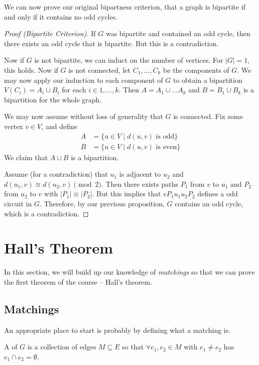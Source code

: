 We can now prove our original bipartness criterion, that a graph is bipartite if and only if it contains no odd cycles.

\begin{proof}[Proof (Bipartite Criterion)]
	If $G$ was bipartite and contained an odd cycle, then there exists an odd cycle that is bipartite. But this is a contradiction.

	Now if $G$ is not bipartite, we can induct on the number of vertices. For $|G| = 1$, this holds. Now if $G$ is not connected, let $C_1, \dots, C_k$ be the components of $G$. We may now apply our induction to each component of $G$ to obtain a bipartition $V(C_i) = A_i \cup B_i$ for each $i \in 1, \dots, k$. Then $A = A_1 \cup \dots A_k$ and $B = B_1 \cup B_k$ is a bipartition for the whole graph. 
	
	We may now assume without loss of generality that $G$ is connected. Fix some vertex $v \in V$, and define 
	\begin{align*}
		A &= \{u \in V \mid d(u, v) \text{ is odd} \} \\
		B &=  \{u \in V \mid d(u, v) \text{ is even} \}
	\end{align*}
	We claim that $A \cup B$ is a bipartition.

	Assume (for a contradiction) that $u_1$ is adjacent to $u_2$ and $d(u_1, v) \cong d(u_2, v) \pmod{2}$. Then there exists paths $P_1$ from $v$ to $u_1$ and $P_2$ from $u_2$ to $v$ with $|P_1| \equiv |P_2|$. But this implies that $vP_1u_1 u_2 P_2$ defines a odd circuit in $G$. Therefore, by our previous proposition, $G$ contains an odd cycle, which is a contradiction. 
\end{proof}

\section{Hall's Theorem}

In this section, we will build up our knowledge of \emph{matchings} so that we can prove the first theorem of the course -- Hall's theorem.

\subsection{Matchings}

An appropriate place to start is probably by defining what a matching is.

\begin{definition}[Matching]
	A  of $G$ is a collection of edges $M \subseteq E$ so that $\forall e_1, e_2 \in M$ with $e_1 \neq e_2$ has $e_1 \cap e_2 = \emptyset$.
\end{definition}

